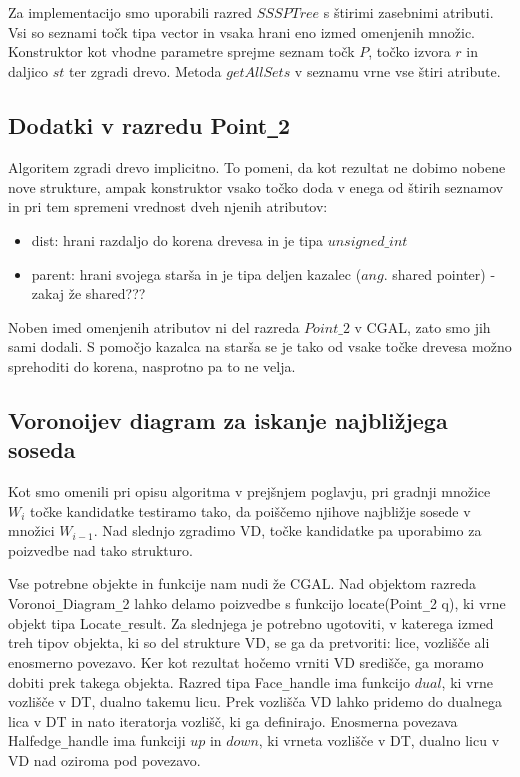 \documentclass[a4paper, 12pt]{book}
\begin{document}
Za implementacijo smo uporabili razred $SSSPTree$ s štirimi zasebnimi atributi. Vsi so seznami točk tipa vector in vsaka hrani eno izmed omenjenih množic. Konstruktor kot vhodne parametre sprejme seznam točk $P$, točko izvora $r$ in daljico $st$ ter zgradi drevo. Metoda $getAllSets$ v seznamu vrne vse štiri atribute.

\subsection{Dodatki v razredu Point\texttt{\_}2}
Algoritem zgradi drevo implicitno. To pomeni, da kot rezultat ne dobimo nobene nove strukture, ampak konstruktor vsako točko doda v enega od štirih seznamov in pri tem spremeni vrednost dveh njenih atributov:

\begin{itemize}
\item dist: hrani razdaljo do korena drevesa in je tipa $unsigned\texttt{\_}int$
\item parent: hrani svojega starša in je tipa deljen kazalec ($ang.$ shared pointer) - zakaj že shared???
\end{itemize}

Noben imed omenjenih atributov ni del razreda $Point\texttt{\_}2$ v CGAL, zato smo jih sami dodali. S pomočjo kazalca na starša se je tako od vsake točke drevesa možno sprehoditi do korena, nasprotno pa to ne velja.

\subsection{Voronoijev diagram za iskanje najbližjega soseda}

Kot smo omenili pri opisu algoritma v prejšnjem poglavju, pri gradnji množice $W_i$ točke kandidatke testiramo tako, da poiščemo njihove najbližje sosede v množici $W_{i-1}$. Nad slednjo zgradimo VD, točke kandidatke pa uporabimo za poizvedbe nad tako strukturo.

Vse potrebne objekte in funkcije nam nudi že CGAL. Nad objektom razreda Voronoi\texttt{\_}Diagram\texttt{\_}2 lahko delamo poizvedbe s funkcijo locate(Point\texttt{\_}2 q), ki vrne objekt tipa Locate\texttt{\_}result. Za slednjega je potrebno ugotoviti, v katerega izmed treh tipov objekta, ki so del strukture VD, se ga da pretvoriti: lice, vozlišče ali enosmerno povezavo. Ker kot rezultat hočemo vrniti VD središče, ga moramo dobiti prek takega objekta. Razred tipa Face\texttt{\_}handle ima funkcijo $dual$, ki vrne vozlišče v DT, dualno takemu licu. Prek vozlišča VD lahko pridemo do dualnega lica v DT in nato iteratorja vozlišč, ki ga definirajo. Enosmerna povezava Halfedge\texttt{\_}handle ima funkciji $up$ in $down$, ki vrneta vozlišče v DT, dualno licu v VD nad oziroma pod povezavo.
\end{document}
